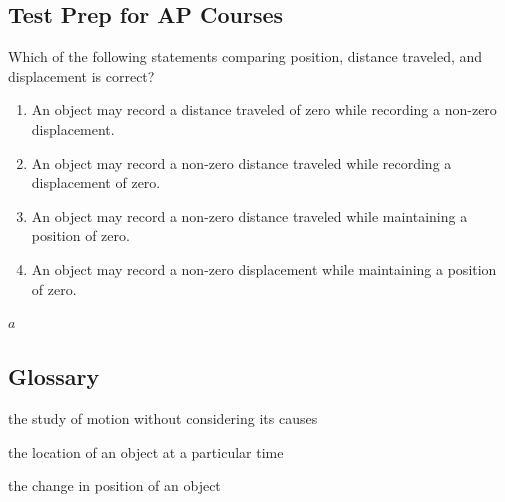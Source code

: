 \documentclass[
]{book}
\providecommand{\tightlist}{%
  \setlength{\itemsep}{0pt}\setlength{\parskip}{0pt}}
\newenvironment{ap-test-prep}{}{}
\begin{document}
\hypertarget{fs-id1915464}{}
\begin{ap-test-prep}

\hypertarget{test-prep-for-ap-courses}{%
\subsection{Test Prep for AP Courses}\label{test-prep-for-ap-courses}}

\hypertarget{fs-id1862594}{}
\leavevmode\hypertarget{fs-id2378785}{}%
Which of the following statements comparing position, distance traveled,
and displacement is correct?

\begin{enumerate}
\def\labelenumi{\alph{enumi}.}
\tightlist
\item
  An object may record a distance traveled of zero while recording a
  non-zero displacement.
\item
  An object may record a non-zero distance traveled while recording a
  displacement of zero.
\item
  An object may record a non-zero distance traveled while maintaining
  a position of zero.
\item
  An object may record a non-zero displacement while maintaining a
  position of zero.
\end{enumerate}

\leavevmode\hypertarget{fs-id2165037}{}%
\(a\)

\end{ap-test-prep}

\hypertarget{glossary}{%
\subsection{Glossary}\label{glossary}}

\begin{description}
\tightlist
\item[kinematics]
the study of motion without considering its causes
\end{description}

\begin{description}
\tightlist
\item[position]
the location of an object at a particular time
\end{description}

\begin{description}
\tightlist
\item[displacement]
the change in position of an object
\end{description}
\end{document}
